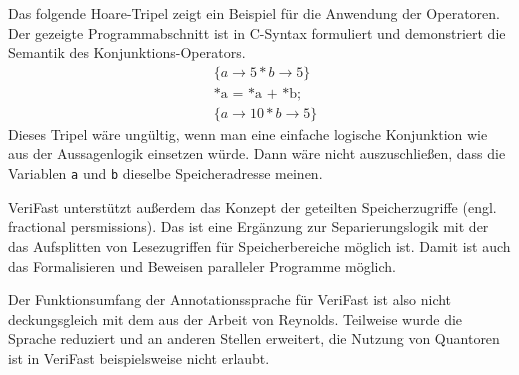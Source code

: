 Das folgende Hoare-Tripel zeigt ein Beispiel für die Anwendung der Operatoren. Der gezeigte Programmabschnitt ist in C-Syntax
formuliert und demonstriert die Semantik des Konjunktions-Operators.
\begin{align*}
& \{a \to 5 \ast b \to 5 \} \\
& \text{*a = *a + *b;} \\
& \{a \to 10 \ast b \to 5\}
\end{align*}
Dieses Tripel wäre ungültig, wenn man eine einfache logische Konjunktion wie aus der Aussagenlogik einsetzen würde. Dann
wäre nicht auszuschließen, dass die Variablen \lstinline{a} und \lstinline{b} dieselbe Speicheradresse meinen.

VeriFast unterstützt außerdem das Konzept der geteilten Speicherzugriffe (engl. fractional persmissions). Das
ist eine Ergänzung zur Separierungslogik mit der das Aufsplitten von Lesezugriffen für Speicherbereiche möglich ist\cite{concurrent}.
Damit ist auch das Formalisieren und Beweisen paralleler Programme möglich.  

Der Funktionsumfang der Annotationssprache für VeriFast ist also nicht deckungsgleich mit dem aus der Arbeit von Reynolds.
Teilweise wurde die Sprache reduziert und an anderen Stellen erweitert, die Nutzung von Quantoren ist in VeriFast beispielsweise
nicht erlaubt.
